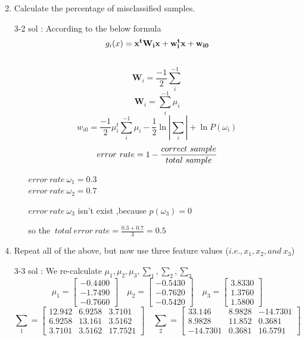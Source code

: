 \documentclass[14pt]{report}
\begin{document}
\begin{enumerate}
\[		\]
		\item Calculate the percentage of misclassified samples.
		\item[3-2] sol :  According to the below formula \\
		\[g_i(x)=\bf{x}^t\bf{W}_i\bf{x}+{w}^t_ix+w_{i0}\]\\
		\[\textbf{W}_i=\frac{-1}{2}\sum_{i}^{-1}\]
		\[\textbf{W}_i=\sum_{i}^{-1}\mu_i\]
		\[w_{i0}=\frac{-1}{2}\mu_i^t\sum_{i}^{-1}\mu_i-\frac{1}{2}\ln |\sum_i|+\ln P(\omega_i)\]
		\[
		error\ rate=1- \frac{correct\ sample}{total\ sample}\\
		\]
		\begin{itemize}\color{red}
		\item[] $error\ rate\ \omega_1 = 0.3$ \\ $error\ rate\ \omega_2= 0.7$
		\item[] $error\ rate\ \omega_3$ isn't exist ,because $p(\omega_3)=0$
		\item[] so the $\ total\ error\ rate=\frac{0.3+0.7}{3}=0.5$ \\
		\end{itemize}
		\item Repeat all of the above, but now use three feature values ($i.e.,x_1,x_2,and\ x_3$)
		\item[3-3] sol : We re-calculate $\mu_1,\mu_2,\mu_3,\sum_1,\sum_2,\sum_3$
		\[
		\mu_1= \left[
		\begin{array}{clr}-0.4400 \\ -1.7490 \\ -0.7660\end{array} \right]\quad
		\mu_2= \left[
		\begin{array}{clr}-0.5430 \\ -0.7620 \\ -0.5420\end{array} \right]\quad
		\mu_3= \left[
		\begin{array}{clr}3.8330 \\ 1.3760 \\ 1.5800\end{array} \right]
		\]
		\[
		\sum_1=\left[
		\begin{array}{clr}12.942 & 6.9258 & 3.7101 \\ 6.9258 & 13.161 & 3.5162 \\ 3.7101 & 3.5162 & 17.7521\end{array} \right]\quad
		\sum_2=\left[
		\begin{array}{clr}33.146 & 8.9828 & -14.7301 \\ 8.9828 & 11.852 & 0.3681 \\ -14.7301 & 0.3681 & 16.5791\end{array} \right]\]

\end{enumerate}
\end{document}
